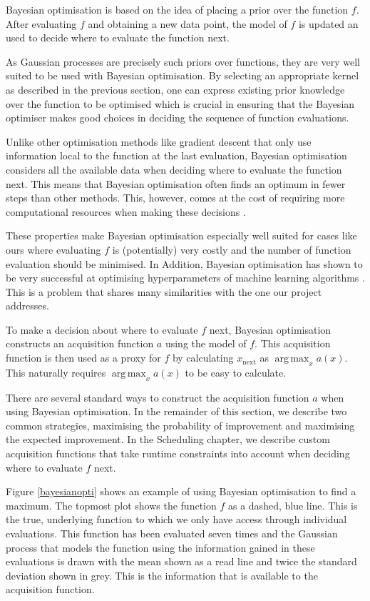 \documentclass[a4paper,12pt,twoside,openright]{report}
\DeclareMathOperator*{\argmax}{arg\,max}
\begin{document}
Bayesian optimisation is based on the idea of placing a prior over the function $f$. After evaluating $f$ and obtaining a new data point, the model of $f$ is updated an used to decide where to evaluate the function next.

As Gaussian processes are precisely such priors over functions, they are very well suited to be used with Bayesian optimisation. By selecting an appropriate kernel as described in the previous section, one can express existing prior knowledge over the function to be optimised which is crucial in ensuring that the Bayesian optimiser makes good choices in deciding the sequence of function evaluations.

Unlike other optimisation methods like gradient descent that only use information local to the function at the last evaluation, Bayesian optimisation considers all the available data when deciding where to evaluate the function next. This means that Bayesian optimisation often finds an optimum in fewer steps than other methods. This, however, comes at the cost of requiring more computational resources when making these decisions \cite{PracticalBayesianOptimization}.

These properties make Bayesian optimisation especially well suited for cases like ours where evaluating $f$ is (potentially) very costly and the number of function evaluation should be minimised. In Addition, Bayesian optimisation has shown to be very successful at optimising hyperparameters of machine learning algorithms \cite{PracticalBayesianOptimization}. This is a problem that shares many similarities with the one our project addresses.

To make a decision about where to evaluate $f$ next, Bayesian optimisation constructs an acquisition function $a$ using the model of $f$. This acquisition function is then used as a proxy for $f$ by calculating $x_{\text{next}}$ as $\argmax_x a(x)$. This naturally requires $\argmax_x a(x)$ to be easy to calculate.

There are several standard ways to construct the acquisition function $a$ when using Bayesian optimisation. In the remainder of this section, we describe two common strategies, maximising the probability of improvement and maximising the expected improvement. In the Scheduling chapter, we describe custom acquisition functions that take runtime constraints into account when deciding where to evaluate $f$ next.

Figure \ref{bayesianopti} shows an example of using Bayesian optimisation to find a maximum. The topmost plot shows the function $f$ as a dashed, blue line. This is the true, underlying function to which we only have access through individual evaluations. This function has been evaluated seven times and the Gaussian process that models the function using the information gained in these evaluations is drawn with the mean shown as a read line and twice the standard deviation shown in grey. This is the information that is available to the acquisition function.
\end{document}
